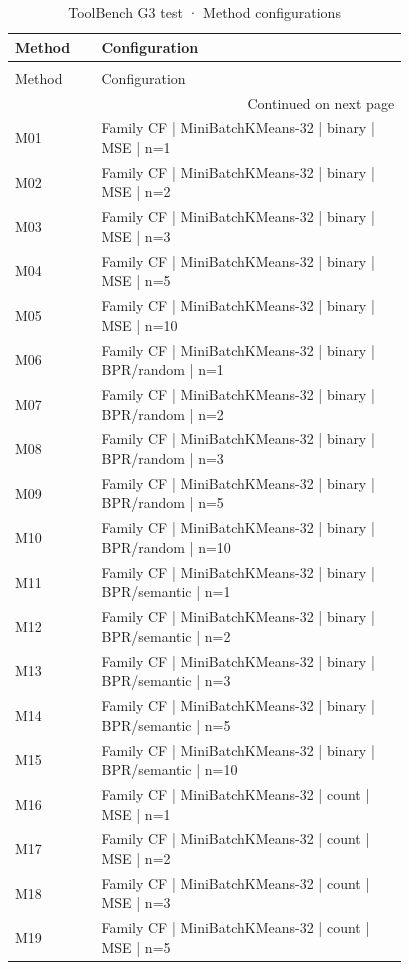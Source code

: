 \begin{longtable}{lp{0.78\linewidth}}
\caption{ToolBench G3 test · Method configurations} \label{tab:ToolBench-G3-test-family-family-methods} \\
\toprule
Method & Configuration \\
\midrule
\endfirsthead
\caption[]{ToolBench G3 test · Method configurations} \\
\toprule
Method & Configuration \\
\midrule
\endhead
\midrule
\multicolumn{2}{r}{Continued on next page} \\
\midrule
\endfoot
\bottomrule
\endlastfoot
M01 & Family CF | MiniBatchKMeans-32 | binary | MSE | n=1 \\
M02 & Family CF | MiniBatchKMeans-32 | binary | MSE | n=2 \\
M03 & Family CF | MiniBatchKMeans-32 | binary | MSE | n=3 \\
M04 & Family CF | MiniBatchKMeans-32 | binary | MSE | n=5 \\
M05 & Family CF | MiniBatchKMeans-32 | binary | MSE | n=10 \\
M06 & Family CF | MiniBatchKMeans-32 | binary | BPR/random | n=1 \\
M07 & Family CF | MiniBatchKMeans-32 | binary | BPR/random | n=2 \\
M08 & Family CF | MiniBatchKMeans-32 | binary | BPR/random | n=3 \\
M09 & Family CF | MiniBatchKMeans-32 | binary | BPR/random | n=5 \\
M10 & Family CF | MiniBatchKMeans-32 | binary | BPR/random | n=10 \\
M11 & Family CF | MiniBatchKMeans-32 | binary | BPR/semantic | n=1 \\
M12 & Family CF | MiniBatchKMeans-32 | binary | BPR/semantic | n=2 \\
M13 & Family CF | MiniBatchKMeans-32 | binary | BPR/semantic | n=3 \\
M14 & Family CF | MiniBatchKMeans-32 | binary | BPR/semantic | n=5 \\
M15 & Family CF | MiniBatchKMeans-32 | binary | BPR/semantic | n=10 \\
M16 & Family CF | MiniBatchKMeans-32 | count | MSE | n=1 \\
M17 & Family CF | MiniBatchKMeans-32 | count | MSE | n=2 \\
M18 & Family CF | MiniBatchKMeans-32 | count | MSE | n=3 \\
M19 & Family CF | MiniBatchKMeans-32 | count | MSE | n=5 \\

\end{longtable}
